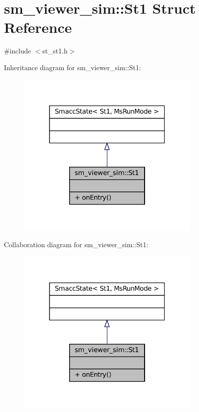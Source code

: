 \hypertarget{structsm__viewer__sim_1_1St1}{}\section{sm\+\_\+viewer\+\_\+sim\+:\+:St1 Struct Reference}
\label{structsm__viewer__sim_1_1St1}


{\ttfamily \#include $<$st\+\_\+st1.\+h$>$}



Inheritance diagram for sm\+\_\+viewer\+\_\+sim\+:\+:St1\+:
\nopagebreak
\begin{figure}[H]
\begin{center}
\leavevmode
\includegraphics[width=256pt]{structsm__viewer__sim_1_1St1__inherit__graph}
\end{center}
\end{figure}


Collaboration diagram for sm\+\_\+viewer\+\_\+sim\+:\+:St1\+:
\nopagebreak
\begin{figure}[H]
\begin{center}
\leavevmode
\includegraphics[width=256pt]{structsm__viewer__sim_1_1St1__coll__graph}
\end{center}
\end{figure}
